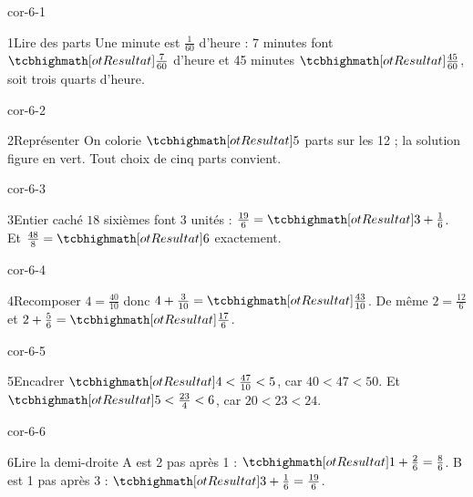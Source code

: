 \clearpage\pagestyle{otMain}\setlength{\otBlocEspacement}{2.5mm}\fontsize{11}{15}\selectfont{}
\begin{blocLivre}{cor-6-1}\begin{corrige}{1}{Lire des parts}
Une minute est $\frac1{60}$ d’heure : 7 minutes font $\res{\frac7{60}}$ d’heure et 45 minutes $\res{\frac{45}{60}}$, soit trois quarts d’heure.
\end{corrige}\end{blocLivre}
\begin{blocLivre}{cor-6-2}\begin{corrige}{2}{Représenter}
On colorie $\res5$ parts sur les 12 ; la solution figure en vert. Tout choix de cinq parts convient.
\label{fig-cor-6-2}
\end{corrige}\end{blocLivre}
\begin{blocLivre}{cor-6-3}\begin{corrige}{3}{Entier caché}
$18$ sixièmes font 3 unités : $\frac{19}6=\res{3+\frac16}$. Et $\frac{48}8=\res6$ exactement.
\end{corrige}\end{blocLivre}
\begin{blocLivre}{cor-6-4}\begin{corrige}{4}{Recomposer}
$4=\frac{40}{10}$ donc $4+\frac3{10}=\res{\frac{43}{10}}$. De même $2=\frac{12}6$ et $2+\frac56=\res{\frac{17}6}$.
\end{corrige}\end{blocLivre}
\begin{blocLivre}{cor-6-5}\begin{corrige}{5}{Encadrer}
$\res{4<\frac{47}{10}<5}$, car $40<47<50$. Et $\res{5<\frac{23}4<6}$, car $20<23<24$.
\end{corrige}\end{blocLivre}
\begin{blocLivre}{cor-6-6}\begin{corrige}{6}{Lire la demi-droite}
A est 2 pas après 1 : $\res{1+\frac26=\frac86}$. B est 1 pas après 3 : $\res{3+\frac16=\frac{19}6}$.
\label{fig-cor-6-6}
\end{corrige}\end{blocLivre}
